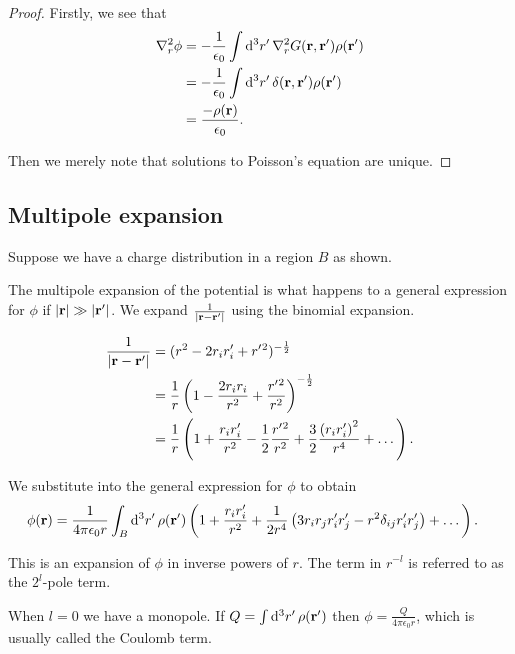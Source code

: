 \documentclass{notes}
\newcommand{\rv}{\vect{r}}
\begin{document}
\begin{proof}
Firstly, we see that
\begin{align*}
\nabla^2_r \phi &= - \frac{1}{\epsilon_0} \int \ud^3 r'\, \nabla^2_r G(\rv,\rv')
\rho(\rv') \\
&= - \frac{1}{\epsilon_0} \int \ud^3 r'\, \delta(\rv,\rv') \rho(\rv') \\
&= \frac{-\rho(\rv)}{\epsilon_0}.
\end{align*}

Then we merely note that solutions to Poisson's equation are unique.
\end{proof}

\subsection{Multipole expansion}

Suppose we have a charge distribution in a region $B$ as shown.

\vspace{1in}

The multipole expansion of the potential is what happens to a general
expression for $\phi$ if $\abs{\rv} \gg \abs{\rv'}$.  We expand
$\frac{1}{\abs{\rv - \rv'}}$ using the binomial expansion.

\begin{align*}
\frac{1}{\abs{\rv - \rv'}} &= (r^2 - 2 r_i r_i' + r'{}^2)^{-\frac{1}{2}} \\
&= \frac{1}{r} \left(1 - \frac{2 r_i r_i}{r^2} + \frac{r'{}^2}{r^2}
\right)^{-\frac{1}{2}} \\
&= \frac{1}{r} \left(
1 + \frac{r_i r'_i}{r^2} - \frac{1}{2} \frac{r'{}^2}{r^2} + \frac{3}{2}
\frac{ \left( r_i r'_i\right)^2}{r^4} + \dots \right).
\end{align*}

We substitute into the general expression for $\phi$ to obtain
\begin{align*}
\phi(\rv) &= \frac{1}{4 \pi \epsilon_0 r}
\int_B \ud^3 r'\, \rho(\rv') \left(
1 + \frac{r_i r'_i}{r^2} + \frac{1}{2 r^4} \left(
3 r_i r_j r'_i r'_j - r^2 \delta_{ij} r'_i r'_j
\right)+ \dots \right).
\end{align*}

This is an expansion of $\phi$ in inverse powers of $r$.  The term in
$r^{-l}$ is referred to as the $2^l$-pole term.

When $l=0$ we have a monopole.  If $Q = \int \ud^3 r'\, \rho(\rv')$
then $\phi = \frac{Q}{4 \pi \epsilon_0 r}$, which is usually called the
Coulomb term.
\end{document}
